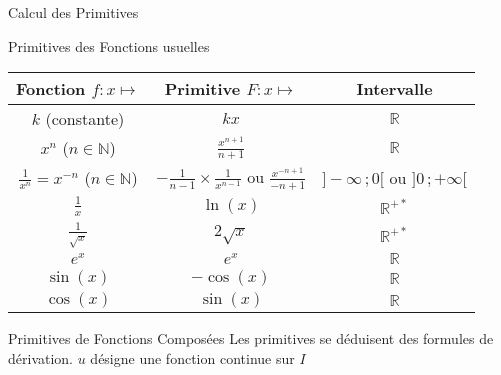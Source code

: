 \documentclass{cours}
\begin{document}
    \begin{Gpartie}{Calcul des Primitives} 
        \begin{Spartie}{Primitives des Fonctions usuelles} 
            \begin{center}\begin{tabular}[c]{ |c|c|c| } \hline
                Fonction $f:x\mapsto$                       & Primitive $F:x\mapsto$                                            & Intervalle  \\ \hline\hline
                $k$ (constante)                             & $kx$                                                              & $\mathbb{R}$ \\ \hline
                $x^n$ ($n\in\mathbb{N}$)                    & $\frac{x^{n+1}}{n+1}$                                             & $\mathbb{R}$ \\ \hline
                $\frac{1}{x^n}=x^{-n}$ ($n\in\mathbb{N}$)   & $-\frac{1}{n-1}\times\frac{1}{x^{n-1}}$ ou $\frac{x^{-n+1}}{-n+1}$& $\big]-\infty\,;0\big[$ ou $\big]0\,;+\infty\big[$ \\ \hline
                $\frac{1}{x}$                               & $\ln(x)$                                                          & $\mathbb{R^{+*}}$ \\ \hline
                $\frac{1}{\sqrt{x}}$                        & $2\sqrt{x}$                                                       & $\mathbb{R^{+*}}$ \\ \hline
                $e^x$                                       & $e^x$                                                             & $\mathbb{R}$ \\ \hline
                $\sin(x)$                                   & $-\cos(x)$                                                        & $\mathbb{R}$ \\ \hline
                $\cos(x)$                                   & $\sin(x)$                                                         & $\mathbb{R}$ \\ \hline
            \end{tabular}\end{center}
            \parbox{\linewidth}{}
        \end{Spartie}
        \begin{Spartie}{Primitives de Fonctions Composées}
            Les primitives se déduisent des formules de dérivation. $u$ désigne une fonction continue sur $I$ \vspace{2ex}

\end{Spartie}
\end{Gpartie}
\end{document}
